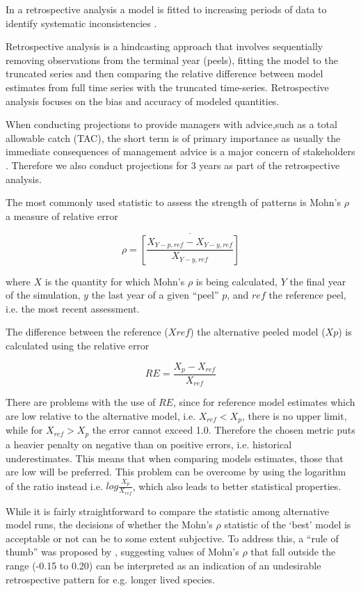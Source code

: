 In a retrospective analysis a model is fitted to increasing periods of data to identify systematic inconsistencies \citep{Mohn1999retrospective}.

Retrospective analysis is a hindcasting approach that involves sequentially removing observations from the terminal year (peels), fitting the model to the truncated series and then comparing the relative difference between model estimates from full time series with the truncated time-series. Retrospective analysis focuses on the bias and accuracy of modeled quantities. 

When conducting projections to provide managers with advice,such as a total allowable catch (TAC), the short term is of primary importance as usually the immediate consequences of management advice is a major concern of stakeholders \citep{fricker2013three}. Therefore we also conduct projections for 3 years as part of the retrospective analysis.

The most commonly used statistic to assess the strength of patterns is Mohn’s $\rho$ a measure of relative error

\begin{equation}\rho = \overline{ \left[ \frac{X_{Y-p,ref}-X_{Y-y,ref}}{X_{Y-y,ref}} \right]}\end{equation}

where $X$ is the quantity for which Mohn’s $\rho$ is being calculated, $Y$ the final year of the simulation, $y$ the last year of a given “peel” $p$, and $ref$ the reference peel, i.e. the most recent assessment.

The difference between the reference ($X{ref}$) the alternative peeled model ($X{p}$) is calculated using the relative error 

\begin{equation} RE=\frac{X_{p}-X_{ref}}{X_{ref}} \end{equation}
    
There are problems with the use of $RE$, since for reference model estimates which are low relative to the alternative model, i.e. $X_{ref} < X_{p}$, there is no upper limit, while for $X_{ref} > X_{p}$ the error cannot exceed 1.0. Therefore the chosen metric puts a heavier penalty on negative than on positive errors, i.e. historical underestimates. This means that when comparing models estimates, those that are low will be preferred. This problem can be overcome by using the logarithm of the ratio instead i.e. $log\frac{X_{p}}{X_{ref}}$, which also leads to better statistical properties.

While it is fairly straightforward to compare the  statistic among alternative model runs, the decisions of whether the Mohn’s $\rho$ statistic of the ‘best’ model is acceptable or not can be to some extent subjective. To address this, a “rule of thumb” was proposed by \cite{hurtado2014}, suggesting values of Mohn’s $\rho$ that fall outside the range (-0.15 to 0.20) can be interpreted as an indication of an undesirable retrospective pattern for e.g. longer lived species.




